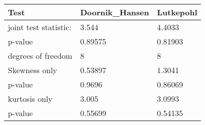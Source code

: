 \begin{tabular}{lll}
Test & Doornik_Hansen & Lutkepohl \\ 
\hline 
joint test statistic: & 3.544 & 4.4033 \\ 
p-value & 0.89575 & 0.81903 \\ 
degrees of freedom & 8 & 8 \\ 
Skewness only & 0.53897 & 1.3041 \\ 
p-value & 0.9696 & 0.86069 \\ 
kurtosis only & 3.005 & 3.0993 \\ 
p-value & 0.55699 & 0.54135 \\ 
\hline 
\end{tabular}